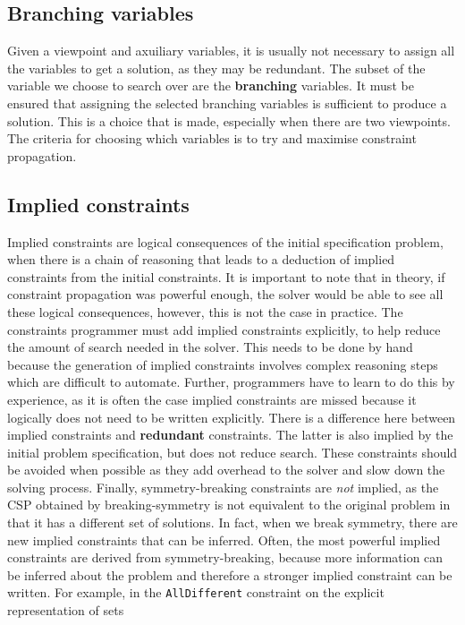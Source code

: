 \documentclass[CS4402-Notes.tex]{subfiles}
\begin{document}
\subsection{Branching variables}
Given a viewpoint and axuiliary variables, it is usually not necessary to assign all the variables to get a solution, as they may be redundant. The subset of the variable we choose to search over are the \textbf{branching} variables. It must be ensured that assigning the selected branching variables is sufficient to produce a solution. This is a choice that is made, especially when there are two viewpoints. The criteria for choosing which variables is to try and maximise constraint propagation.

\subsection{Implied constraints}
Implied constraints are logical consequences of the initial specification problem, when there is a chain of reasoning that leads to a deduction of implied constraints from the initial constraints. It is important to note that in theory, if constraint propagation was powerful enough, the solver would be able to see all these logical consequences, however, this is not the case in practice.
\n
The constraints programmer must add implied constraints explicitly, to help reduce the amount of search needed in the solver. This needs to be done by hand because the generation of implied constraints involves complex reasoning steps which are difficult to automate. Further, programmers have to learn to do this by experience, as it is often the case implied constraints are missed because it logically does not need to be written explicitly.
\n
There is a difference here between implied constraints and \textbf{redundant} constraints. The latter is also implied by the initial problem specification, but does not reduce search. These constraints should be avoided when possible as they add overhead to the solver and slow down the solving process.
\n
Finally, symmetry-breaking constraints are \textit{not} implied, as the CSP obtained by breaking-symmetry is not equivalent to the original problem in that it has a different set of solutions. In fact, when we break symmetry, there are new implied constraints that can be inferred. Often, the most powerful implied constraints are derived from symmetry-breaking, because more information can be inferred about the problem and therefore a stronger implied constraint can be written. For example, in the \texttt{AllDifferent} constraint on the explicit representation of sets
\end{document}
